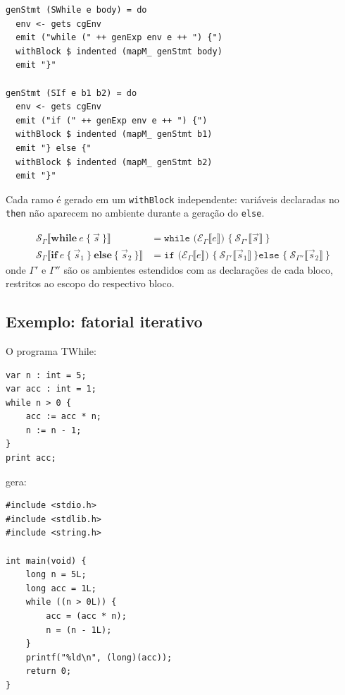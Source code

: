 \begin{verbatim}
genStmt (SWhile e body) = do
  env <- gets cgEnv
  emit ("while (" ++ genExp env e ++ ") {")
  withBlock $ indented (mapM_ genStmt body)
  emit "}"

genStmt (SIf e b1 b2) = do
  env <- gets cgEnv
  emit ("if (" ++ genExp env e ++ ") {")
  withBlock $ indented (mapM_ genStmt b1)
  emit "} else {"
  withBlock $ indented (mapM_ genStmt b2)
  emit "}"
\end{verbatim}

Cada ramo é gerado em um \texttt{withBlock} independente: variáveis declaradas
no \texttt{then} não aparecem no ambiente durante a geração do \texttt{else}.

\begin{Definition}\label{def:twhile-stmt}
  \begin{align*}
    \mathcal{S}_\Gamma\llbracket \mathbf{while}\ e\ \{\ \vec{s}\ \} \rrbracket
    &= \texttt{while (}\mathcal{E}_\Gamma\llbracket e \rrbracket\texttt{) \{}\
      \mathcal{S}_{\Gamma'}\llbracket \vec{s} \rrbracket\
    \texttt{\}} \\
    \mathcal{S}_\Gamma\llbracket
    \mathbf{if}\ e\ \{\ \vec{s}_1\ \}\ \mathbf{else}\ \{\ \vec{s}_2\ \}
    \rrbracket
    &= \texttt{if (}\mathcal{E}_\Gamma\llbracket e
      \rrbracket\texttt{) \{}\ \mathcal{S}_{\Gamma'}\llbracket
      \vec{s}_1 \rrbracket\ \texttt{\} else
    \{}\ \mathcal{S}_{\Gamma''}\llbracket \vec{s}_2 \rrbracket\ \texttt{\}}
  \end{align*}
  onde $\Gamma'$ e $\Gamma''$ são os ambientes estendidos com as declarações de
  cada bloco, restritos ao escopo do respectivo bloco.
\end{Definition}

\subsection{Exemplo: fatorial iterativo}

O programa TWhile:
\begin{verbatim}
var n : int = 5;
var acc : int = 1;
while n > 0 {
    acc := acc * n;
    n := n - 1;
}
print acc;
\end{verbatim}

gera:

\begin{verbatim}
#include <stdio.h>
#include <stdlib.h>
#include <string.h>

int main(void) {
    long n = 5L;
    long acc = 1L;
    while ((n > 0L)) {
        acc = (acc * n);
        n = (n - 1L);
    }
    printf("%ld\n", (long)(acc));
    return 0;
}
\end{verbatim}

